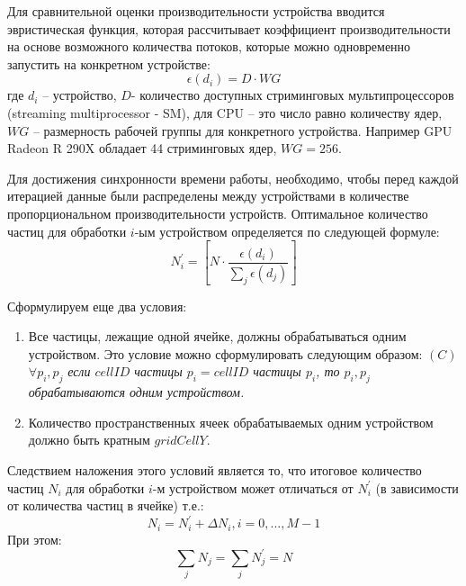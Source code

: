 Для сравнительной оценки производительности устройства вводится эвристическая функция, которая рассчитывает коэффициент производительности на основе возможного количества потоков, которые можно одновременно запустить на конкретном устройстве:
\[
  \epsilon(d_i)=D \cdot WG
\]
где \(d_i\) – устройство, \(D\)- количество доступных стриминговых мультипроцессоров (streaming multiprocessor - SM), для CPU – это число равно количеству ядер, \(WG\) – размерность рабочей группы для конкретного устройства. Например GPU Radeon R 290X обладает 44 стриминговых ядер, \(WG=256\).

Для достижения синхронности времени работы, необходимо, чтобы перед каждой итерацией данные были распределены между устройствами в количестве пропорциональном производительности устройств. Оптимальное количество частиц для обработки \(i\)-ым устройством определяется по следующей формуле:
\[
  N_{i}^{'}=\left [ N \cdot \frac{\epsilon(d_i)}{\sum_{j}\epsilon(d_j)} \right ]
\]

Сформулируем еще два условия:
\noindent
\begin{enumerate}
  \item Все частицы, лежащие одной ячейке, должны обрабатываться одним устройством. Это условие можно сформулировать следующим образом:
        \((C)\) \(\forall p_i, p_j\) \textit{если \(cellID\) частицы \(p_i=cellID\) частицы \(p_i\), то \(p_i, p_j\) обрабатываются одним устройством.}
  \item Количество пространственных ячеек обрабатываемых одним устройством должно быть кратным \(gridCellY\).
\end{enumerate}

Следствием наложения этого условий является то, что итоговое количество частиц \(N_i \) для обработки \(i\)-м устройством  может отличаться от \(N_{i}^{'}\) (в зависимости от количества частиц в ячейке) т.е.:
\[
  N_i = N_{i}^{'}+\Delta N_i, i=0,..., M-1
\]
При этом:
\[
  \sum_{j} N_j = \sum_{j}N_{j}^{'}=N
\]

